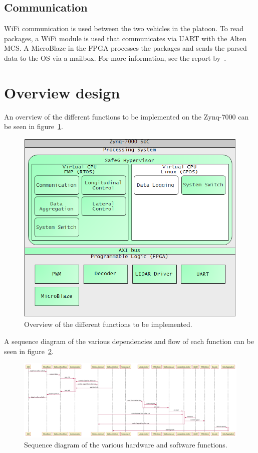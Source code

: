 \subsection{Communication}
WiFi communication is used between the two vehicles in the platoon. To read packages, a WiFi module is used that communicates via UART with the Alten MCS. A MicroBlaze in the FPGA processes the packages and sends the parsed data to the OS via a mailbox. For more information, see the report by~\cite{lerander2017}.

\section{Overview design}
An overview of the different functions to be implemented on the Zynq-7000 can be seen in figure~\ref{fig:overview}.

\begin{figure}[H]
\centering
\includegraphics[width=\textwidth]{./img/design_overview.png}
\caption{Overview of the different functions to be implemented.}\label{fig:overview}
\end{figure}

A sequence diagram of the various dependencies and flow of each function can be seen in figure~\ref{fig:sequence}.

\begin{figure}[H]
\centering
\includegraphics[width=\textwidth]{./img/design_sequence.png}
\caption{Sequence diagram of the various hardware and software functions.}\label{fig:sequence}
\end{figure}

